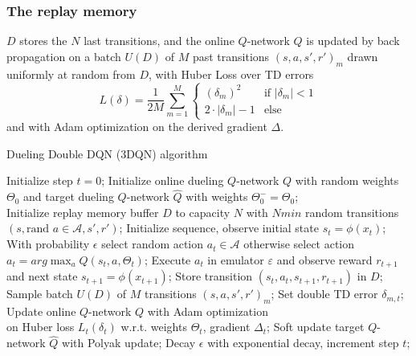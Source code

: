 \documentclass[journal]{IEEEtran}
\begin{document}
\subsubsection{The replay memory} $D$ stores the $N$ last transitions, and the online $Q$-network $Q$ is updated by back propagation on a batch $U(D)$ of $M$ past transitions $(s,a,s',r')_m$ drawn uniformly at random from $D$, with Huber Loss over TD errors
\[ 
L(\delta) = \frac{1}{2M}\sum_{m=1}^M
\begin{cases}
  (\delta_m)^2 & \text{if } |\delta_m| < 1 \\
  2 \cdot |\delta_m| - 1 & \text{else}
\end{cases}
\]
and with Adam optimization \cite{kingma2017adam} on the derived gradient $\Delta$.

\begin{algorithm}[H]
\caption*{Dueling Double DQN (3DQN) algorithm}
\begin{algorithmic}
    \STATE Initialize step $t = 0$;
    \STATE Initialize online dueling $Q$-network $Q$ with random weights $\Theta_0$ and target dueling $Q$-network $\widehat{Q}$ with weights $\Theta^-_0 = \Theta_0$; \\
    \STATE Initialize replay memory buffer $D$ to capacity $N$
    \STATE with $Nmin$ random transitions $(s,\text{rand }a \in \mathcal{A},s',r')$;
        \bindent
        \STATE Initialize sequence, observe initial state $s_t=\phi(x_t)$;
            \bindent
            \STATE With probability $\epsilon$ select random action $a_t \in \mathcal{A}$
            \STATE otherwise select action $a_t = arg\max_{a}Q(s_t,a,\Theta_t)$;
            \STATE Execute $a_t$ in emulator $\varepsilon$ and
            \STATE observe reward $r_{t+1}$ and next state $s_{t+1}=\phi(x_{t+1})$;
            \STATE Store transition $(s_t,a_t,s_{t+1},r_{t+1})$ in $D$;
            \STATE Sample batch $U(D)$ of $M$ transitions $(s,a,s',r')_m$;
                \bindent
                \STATE Set double TD error $\delta_{m,t}$;
                \eindent
            \ENDFOR
            \STATE Update online $Q$-network $Q$ with Adam optimization \\
            on Huber loss $L_t(\delta_t)$ w.r.t. weights $\Theta_t$, gradient $\Delta_t$;
            \STATE Soft update target $Q$-network $\widehat{Q}$ with Polyak update;
            \STATE Decay $\epsilon$ with exponential decay, increment step $t$;
            \eindent
        \ENDWHILE
        \eindent
    \ENDFOR
\end{algorithmic}
\end{algorithm}
\end{document}
